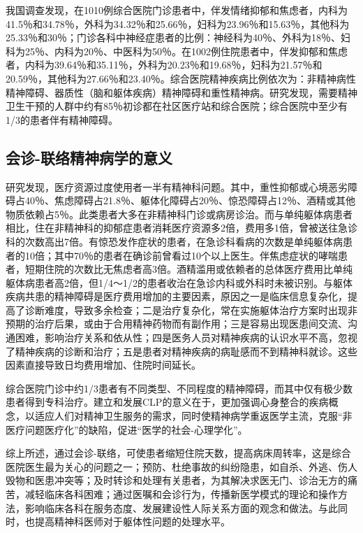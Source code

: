 我国调查发现，在1010例综合医院门诊患者中，伴发情绪抑郁和焦虑者，内科为41.5％和34.78％，外科为34.32％和25.66％，妇科为23.96％和15.63％，其他科为25.33％和30％；门诊各科中神经症患者的比例：神经科为40％、外科为18％、妇科为25％、内科为20％、中医科为50％。在1002例住院患者中，伴发抑郁和焦虑者，内科为39.64％和35.11％，外科为20.23％和19.68％，妇科为21.57％和20.59％，其他科为27.66％和23.40％。综合医院精神疾病比例依次为：非精神病性精神障碍、器质性（脑和躯体疾病）精神障碍和重性精神病。研究发现，需要精神卫生干预的人群中约有85％初诊都在社区医疗站和综合医院；综合医院中至少有1/3的患者伴有精神障碍。

\subsection{会诊-联络精神病学的意义}

研究发现，医疗资源过度使用者一半有精神科问题。其中，重性抑郁或心境恶劣障碍占40％、焦虑障碍占21.8％、躯体化障碍占20％、惊恐障碍占12％、酒精或其他物质依赖占5％。此类患者大多在非精神科门诊或病房诊治。而与单纯躯体病患者相比，住在非精神科的抑郁症患者消耗医疗资源多2倍，费用多1倍，曾被送往急诊科的次数高出7倍。有惊恐发作症状的患者，在急诊科看病的次数是单纯躯体病患者的10倍；其中70％的患者在确诊前曾看过10个以上医生。伴焦虑症状的哮喘患者，短期住院的次数比无焦虑者高3倍。酒精滥用或依赖者的总体医疗费用比单纯躯体病患者高2倍，但1/4～1/2的患者收治在急诊内科或外科时未被识别。与躯体疾病共患的精神障碍是医疗费用增加的主要因素，原因之一是临床信息复杂化，提高了诊断难度，导致多余检查；二是治疗复杂化，常在实施躯体治疗方案时出现非预期的治疗后果，或由于合用精神药物而有副作用；三是容易出现医患间交流、沟通困难，影响治疗关系和依从性；四是医务人员对精神疾病的认识水平不高，忽视了精神疾病的诊断和治疗；五是患者对精神疾病的病耻感而不到精神科就诊。这些因素直接导致日均费用增加、住院时间延长。

综合医院门诊中约1/3患者有不同类型、不同程度的精神障碍，而其中仅有极少数患者得到专科治疗。建立和发展CLP的意义在于，更加强调心身整合的疾病概念，以适应人们对精神卫生服务的需求，同时使精神病学重返医学主流，克服``非医疗问题医疗化''的缺陷，促进``医学的社会-心理学化''。

综上所述，通过会诊-联络，可使患者缩短住院天数，提高病床周转率，这是综合医院医生最为关心的问题之一；预防、杜绝事故的纠纷隐患，如自杀、外逃、伤人毁物和医患冲突等；及时转诊和处理有关患者，为其解决求医无门、诊治无方的痛苦，减轻临床各科困难；通过医嘱和会诊行为，传播新医学模式的理论和操作方法，影响临床各科在服务态度、发展建设性人际关系方面的观念和做法。与此同时，也提高精神科医师对于躯体性问题的处理水平。


